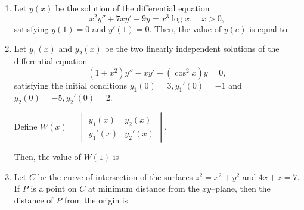 \documentclass[journal,12pt,onecolumn]{IEEEtran}
\theoremstyle{remark}
\begin{document}
\begin{enumerate}
\item Let $y(x)$ be the solution of the differential equation  
$$
x^2y''+7xy'+9y = x^3 \log x, \quad x>0,
$$  
satisfying $y(1)=0$ and $y'(1)=0$.  
Then, the value of $y(e)$ is equal to  

\begin{enumerate}
\end{enumerate}
\hfill{}

\item Let $y_1(x)$ and $y_2(x)$ be the two linearly independent solutions of the differential equation  
$$
(1+x^2)y''-xy'+(\cos^2 x)y=0,
$$  
satisfying the initial conditions $y_1(0)=3, y_1'(0)=-1$ and $y_2(0)=-5, y_2'(0)=2$.  

Define $W(x) = \begin{vmatrix} y_1(x) & y_2(x) \\ y_1'(x) & y_2'(x)\end{vmatrix}$.  

Then, the value of $W(1)$ is  

\begin{enumerate}
\end{enumerate}
\hfill{}

\item Let $C$ be the curve of intersection of the surfaces $z^2=x^2+y^2$ and $4x+z=7$.  
If $P$ is a point on $C$ at minimum distance from the $xy$–plane, then the distance of $P$ from the origin is  

\begin{enumerate}
\end{enumerate}
\hfill{}


\end{enumerate}
\end{document}
